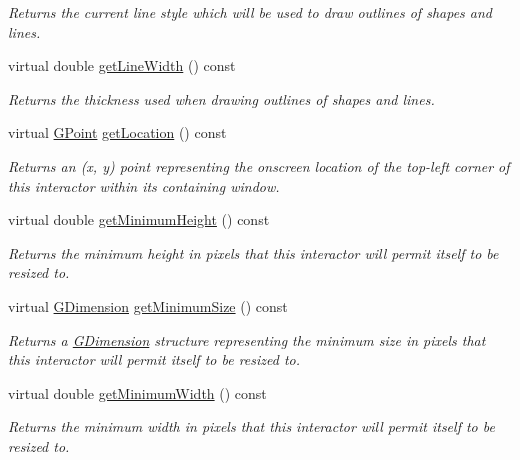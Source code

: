 \begin{DoxyCompactItemize}
\begin{DoxyCompactList}\small\item\em Returns the current line style which will be used to draw outlines of shapes and lines. \end{DoxyCompactList}\item 
virtual double \mbox{\hyperlink{classGDrawingSurface_a85ff266dc3eb63d9f2d8e5a4487fd3c0}{get\+Line\+Width}} () const
\begin{DoxyCompactList}\small\item\em Returns the thickness used when drawing outlines of shapes and lines. \end{DoxyCompactList}\item 
virtual \mbox{\hyperlink{classGPoint}{G\+Point}} \mbox{\hyperlink{classGInteractor_a4f83802015511edeb63b892830812c11}{get\+Location}} () const
\begin{DoxyCompactList}\small\item\em Returns an (x, y) point representing the onscreen location of the top-\/left corner of this interactor within its containing window. \end{DoxyCompactList}\item 
virtual double \mbox{\hyperlink{classGInteractor_aed4b0075fcc434499c3cb3e46896bda3}{get\+Minimum\+Height}} () const
\begin{DoxyCompactList}\small\item\em Returns the minimum height in pixels that this interactor will permit itself to be resized to. \end{DoxyCompactList}\item 
virtual \mbox{\hyperlink{classGDimension}{G\+Dimension}} \mbox{\hyperlink{classGInteractor_a66b5af0b32493b4d597ca0a3df2049ea}{get\+Minimum\+Size}} () const
\begin{DoxyCompactList}\small\item\em Returns a \mbox{\hyperlink{classGDimension}{G\+Dimension}} structure representing the minimum size in pixels that this interactor will permit itself to be resized to. \end{DoxyCompactList}\item 
virtual double \mbox{\hyperlink{classGInteractor_a59e668114fe3d49d2a0f28deb258f7c8}{get\+Minimum\+Width}} () const
\begin{DoxyCompactList}\small\item\em Returns the minimum width in pixels that this interactor will permit itself to be resized to. \end{DoxyCompactList}\item 

\end{DoxyCompactItemize}
